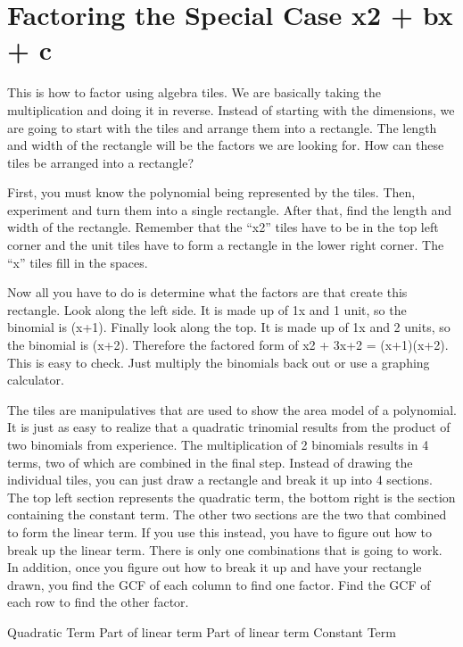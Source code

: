\section{Factoring the Special Case x2 + bx + c}

This is how to factor using algebra tiles. We are basically taking the multiplication and doing it in reverse. Instead of starting with the dimensions, we are going to start with the tiles and arrange them into a rectangle. The length and width of the rectangle will be the factors we are looking for.
How can these tiles be arranged into a rectangle?



First, you must know the polynomial being represented by the tiles. Then, experiment and turn them into a single rectangle. After that, find the length and width of the rectangle. Remember that the ``x2'' tiles have to be in the top left corner and the unit tiles have to form a rectangle in the lower right corner. The ``x'' tiles fill in the spaces.



Now all you have to do is determine what the factors are that create this rectangle. Look along the left side. It is made up of 1x and 1 unit, so the binomial is (x+1). Finally look along the top. It is made up of 1x and 2 units, so the binomial is (x+2). Therefore the factored form of x2 + 3x+2 = (x+1)(x+2). This is easy to check. Just multiply the binomials back out or use a graphing calculator.

The tiles are manipulatives that are used to show the area model of a polynomial. It is just as easy to realize that a quadratic trinomial results from the product of two binomials from experience. The multiplication of 2 binomials results in 4 terms, two of which are combined in the final step. Instead of drawing the individual tiles, you can just draw a rectangle and break it up into 4 sections. The top left section represents the quadratic term, the bottom right is the section containing the constant term. The other two sections are the two that combined to form the linear term. If you use this instead, you have to figure out how to break up the linear term. There is only one combinations that is going to work. In addition, once you figure out how to break it up and have your rectangle drawn, you find the GCF of each column to find one factor. Find the GCF of each row to find the other factor.

Quadratic Term
Part of linear term
Part of linear term
Constant Term

